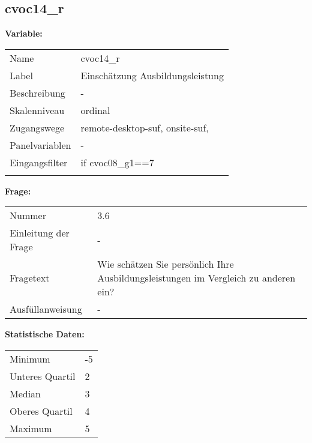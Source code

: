 	
	
	\subsection{cvoc14\_r}
	\label{subSection:cvoc14_r}

	\noindent\textbf{Variable:}\\
		\begin{tabular}{lL{11.3cm}}
			\label{tableVariable:cvoc14_r}
			Name & cvoc14\_r \\
			Label & Einschätzung Ausbildungsleistung \\
			Beschreibung & - \\
			Skalenniveau & ordinal \\
			Zugangswege &
				remote-desktop-suf,
				onsite-suf,
 \\
			Panelvariablen & -
			 \\
			Eingangsfilter & if cvoc08\_g1==7 \\
 \\
		\end{tabular}

		\vspace*{1 cm}
		\noindent\textbf{Frage:}\\
		\begin{tabular}{lL{11.3cm}}
			\label{tableQuestion:cvoc14_r}
			Nummer & 3.6 \\
			Einleitung der Frage & - \\
			Fragetext & Wie schätzen Sie persönlich Ihre Ausbildungsleistungen im Vergleich zu anderen ein? \\
			Ausfüllanweisung & - \\
		\end{tabular}


		\vspace*{1 cm}
		\noindent\textbf{Statistische Daten:}\\
			\begin{tabular}{ll}
				\label{tableStatistics:cvoc14_r}
					Minimum & -5 \\
					Unteres Quartil & 2 \\
					Median & 3 \\
					Oberes Quartil & 4 \\
					Maximum & 5 \\
			\end{tabular}



